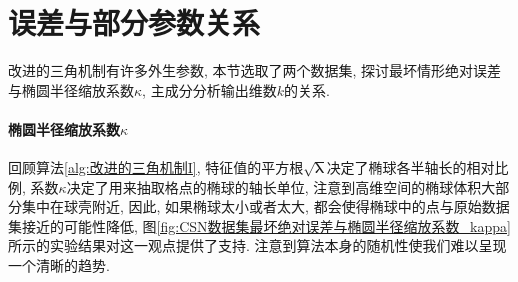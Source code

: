 \section{误差与部分参数关系} %
\label{sec:误差与部分参数关系}
改进的三角机制有许多外生参数, 本节选取了两个数据集, 探讨最坏情形绝对误差与椭圆半径缩放系数$\kappa$, 主成分分析输出维数$k$的关系. 

\paragraph{椭圆半径缩放系数$\kappa$} %
\label{par:椭圆半径缩放系数_kappa_}
回顾算法\ref{alg:改进的三角机制I}, 特征值的平方根$\sqrt{\boldsymbol{\lambda}}$决定了椭球各半轴长的相对比例, 系数$\kappa$决定了用来抽取格点的椭球的轴长单位, 注意到高维空间的椭球体积大部分集中在球壳附近, 因此, 如果椭球太小或者太大, 都会使得椭球中的点与原始数据集接近的可能性降低, 图\ref{fig:CSN数据集最坏绝对误差与椭圆半径缩放系数_kappa}所示的实验结果对这一观点提供了支持. 注意到算法本身的随机性使我们难以呈现一个清晰的趋势.
